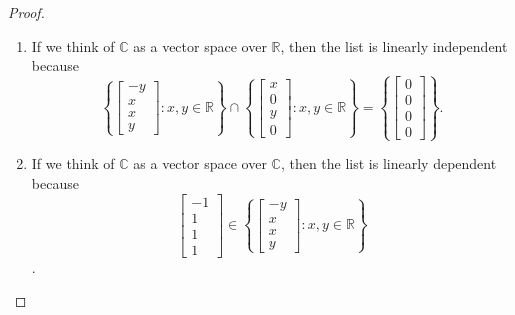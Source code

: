 \begin{proof}
\begin{enumerate}[label=(\alph*)]
\item If we think of $\mathbb{C}$ as a vector space over $\mathbb{R}$, then the list is linearly independent because \[
\left\{\begin{bmatrix}-y\\x\\x\\y\end{bmatrix}:x,y\in\mathbb{R}\right\}\cap\left\{\begin{bmatrix}x\\0\\y\\0\end{bmatrix}:x,y\in\mathbb{R}\right\}=\left\{\begin{bmatrix}0\\0\\0\\0\end{bmatrix}\right\}.
\]
\item If we think of $\mathbb{C}$ as a vector space over $\mathbb{C}$, then the list is linearly dependent because \[
\begin{bmatrix}-1\\1\\1\\1\end{bmatrix}\in\left\{\begin{bmatrix}-y\\x\\x\\y\end{bmatrix}:x,y\in\mathbb{R}\right\}
\].
\end{enumerate}
\end{proof}

